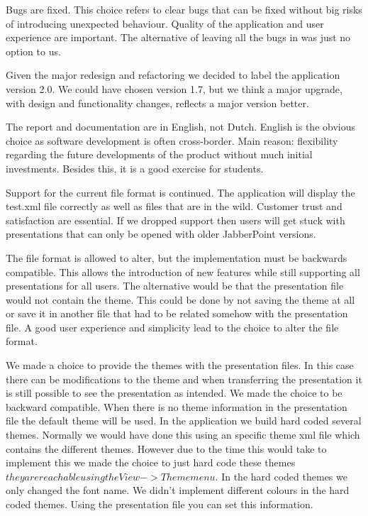 \documentclass[a4paper]{article}
\begin{document}
Bugs are fixed. This choice refers to clear bugs that can be fixed without big risks of introducing unexpected behaviour. Quality of the application and user experience are important. The alternative of leaving all the bugs in was just no option to us.

Given the major redesign and refactoring we decided to label the application version 2.0. We could have chosen version 1.7, but we think a major upgrade, with design and functionality changes, reflects a major version better. 

The report and documentation are in English, not Dutch. English is the obvious choice as software development is often cross-border. Main reason: flexibility regarding the future developments of the product without much initial investments. Besides this, it is a good exercise for students.

Support for the current file format is continued. The application will display the test.xml file correctly as well as files that are in the wild. Customer trust and satisfaction are essential. If we dropped support then users will get stuck with presentations that can only be opened with older JabberPoint versions.
 
The file format is allowed to alter, but the implementation must be backwards compatible. This allows the introduction of new features while still supporting all presentations for all users. The alternative would be that the presentation file would not contain the theme. This could be done by not saving the theme at all or save it in another file that had to be related somehow with the presentation file. A good user experience and simplicity lead to the choice to alter the file format.

We made a choice to provide the themes with the presentation files. In this case there can be modifications to the theme and when transferring the presentation it is still possible to see the presentation as intended. We made the choice to be backward compatible. When there is no theme information in the presentation file the default theme will be used. In the application we build hard coded several themes. Normally we would have done this using an specific theme xml file which contains the different themes. However due to the time this would take to implement this we made the choice to just hard code these themes \(they are reachable using the View->Theme menu. \) In the hard coded themes we only changed the font name. We didn't implement different colours in the hard coded themes. Using the presentation file you can set this information.
\end{document}
